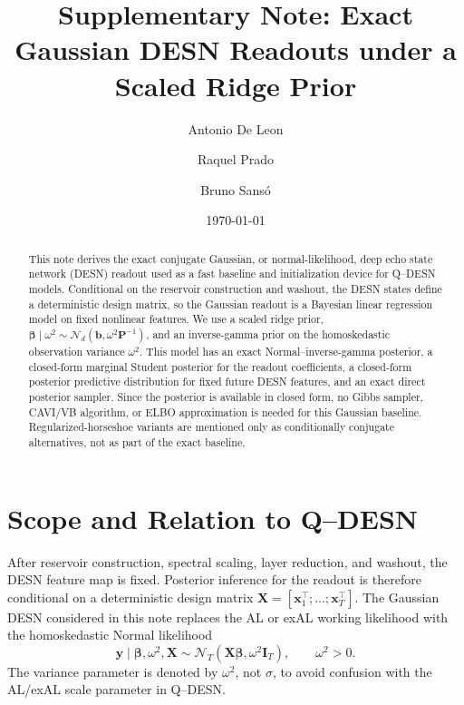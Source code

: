 \documentclass[11pt]{article}
\title{Supplementary Note: Exact Gaussian DESN Readouts under a Scaled Ridge Prior}
\author{Antonio De Leon \and Raquel Prado \and Bruno Sans\'o}
\date{\today}
\newcommand{\vect}[1]{\bm{#1}}
\newcommand{\mat}[1]{\bm{#1}}
\newcommand{\Normal}{\mathcal{N}}
\begin{document}
\maketitle

\begin{abstract}
\noindent
This note derives the exact conjugate Gaussian, or normal-likelihood, deep echo
state network (DESN) readout used as a fast baseline and initialization device
for Q--DESN models. Conditional on the reservoir construction and washout, the
DESN states define a deterministic design matrix, so the Gaussian readout is a
Bayesian linear regression model on fixed nonlinear features. We use a scaled
ridge prior, \(\vect\beta\mid\omega^2\sim\Normal_d(\vect b,\omega^2\mat P^{-1})\),
and an inverse-gamma prior on the homoskedastic observation variance
\(\omega^2\). This model has an exact Normal--inverse-gamma posterior, a
closed-form marginal Student posterior for the readout coefficients, a
closed-form posterior predictive distribution for fixed future DESN features,
and an exact direct posterior sampler. Since the posterior is available in
closed form, no Gibbs sampler, CAVI/VB algorithm, or ELBO approximation is
needed for this Gaussian baseline. Regularized-horseshoe variants are mentioned
only as conditionally conjugate alternatives, not as part of the exact baseline.
\end{abstract}

\section{Scope and Relation to Q--DESN}
\label{sec:scope}

After reservoir construction, spectral scaling, layer reduction, and washout,
the DESN feature map is fixed. Posterior inference for the readout is therefore
conditional on a deterministic design matrix
\(\mat X=[\vect x_1^\top;\ldots;\vect x_T^\top]\). The Gaussian DESN considered
in this note replaces the AL or exAL working likelihood with the homoskedastic
Normal likelihood
\begin{equation}
\label{eq:gaussian_likelihood_scope}
\vect y\mid \vect\beta,\omega^2,\mat X
\sim \Normal_T(\mat X\vect\beta,\omega^2\mat I_T),
\qquad \omega^2>0.
\end{equation}
The variance parameter is denoted by \(\omega^2\), not \(\sigma\), to avoid
confusion with the AL/exAL scale parameter in Q--DESN.
\end{document}
